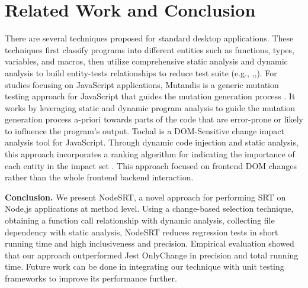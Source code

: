 \documentclass[10pt, conference]{IEEEtran}
\begin{document}
\section{Related Work and Conclusion}
There are several techniques proposed for standard desktop applications. These techniques 
first classify programs into different entities such as functions, types, variables, and macros, then utilize comprehensive static analysis 
and dynamic analysis to build entity-tests relationships to reduce test suite (e.g., \cite{b2, b4, b7, b9, b12},\cite{b13},\cite{b14, b17}).
For studies focusing on JavaScript applications, Mutandis is a generic mutation testing 
approach for JavaScript that guides the mutation generation process \cite{b11}. It works by leveraging static and dynamic program 
analysis to guide the mutation generation process a-priori towards parts of the code that are error-prone or 
likely to influence the program’s output. 
Tochal is a DOM-Sensitive change impact analysis tool for JavaScript. Through dynamic code injection and static analysis, this 
approach incorporates a ranking algorithm for indicating the importance of each entity in the impact set \cite{b1}. This 
approach focused on frontend DOM changes rather than the whole frontend backend interaction.


\textbf{Conclusion.} We present NodeSRT, a novel approach for performing SRT on Node.js applications at method level. Using a change-based selection technique, 
obtaining a function call relationship with dynamic analysis, collecting file dependency with static analysis, NodeSRT reduces regression tests in short running time
and high inclusiveness and precision. Empirical evaluation showed that our approach outperformed Jest OnlyChange in precision and total running time. Future work can 
be done in integrating our technique with unit testing frameworks to improve its performance further.
\end{document}
